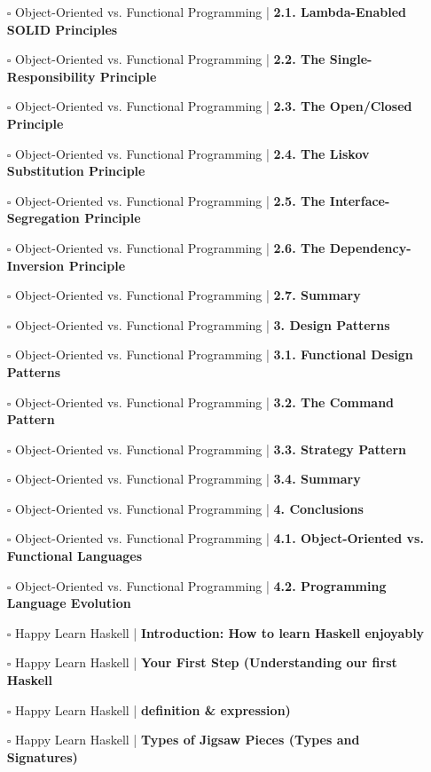 \documentclass[a4, landscape, 12pt]{article}
\newcommand{\checkbox}{$\square$}%
\begin{document}
\begin{itemize}
{}
\item [\checkbox]  Object-Oriented vs. Functional Programming | \textbf{ 2.1. Lambda-Enabled SOLID Principles
}
\item [\checkbox]  Object-Oriented vs. Functional Programming | \textbf{ 2.2. The Single-Responsibility Principle
}
\item [\checkbox]  Object-Oriented vs. Functional Programming | \textbf{ 2.3. The Open/Closed Principle
}
\item [\checkbox]  Object-Oriented vs. Functional Programming | \textbf{ 2.4. The Liskov Substitution Principle
}
\item [\checkbox]  Object-Oriented vs. Functional Programming | \textbf{ 2.5. The Interface-Segregation Principle
}
\item [\checkbox]  Object-Oriented vs. Functional Programming | \textbf{ 2.6. The Dependency-Inversion Principle
}
\item [\checkbox]  Object-Oriented vs. Functional Programming | \textbf{ 2.7. Summary
}
\item [\checkbox]  Object-Oriented vs. Functional Programming | \textbf{ 3. Design Patterns
}
\item [\checkbox]  Object-Oriented vs. Functional Programming | \textbf{ 3.1. Functional Design Patterns
}
\item [\checkbox]  Object-Oriented vs. Functional Programming | \textbf{ 3.2. The Command Pattern
}
\item [\checkbox]  Object-Oriented vs. Functional Programming | \textbf{ 3.3. Strategy Pattern
}
\item [\checkbox]  Object-Oriented vs. Functional Programming | \textbf{ 3.4. Summary
}
\item [\checkbox]  Object-Oriented vs. Functional Programming | \textbf{ 4. Conclusions
}
\item [\checkbox]  Object-Oriented vs. Functional Programming | \textbf{ 4.1. Object-Oriented vs. Functional Languages
}
\item [\checkbox]  Object-Oriented vs. Functional Programming | \textbf{ 4.2. Programming Language Evolution
}
\item [\checkbox]  Happy Learn Haskell | \textbf{ Introduction: How to learn Haskell enjoyably
}
\item [\checkbox]  Happy Learn Haskell | \textbf{ Your First Step (Understanding our first Haskell
}
\item [\checkbox]  Happy Learn Haskell | \textbf{ definition & expression)
}
\item [\checkbox]  Happy Learn Haskell | \textbf{ Types of Jigsaw Pieces (Types and Signatures)
}
\end{itemize}
\end{document}
